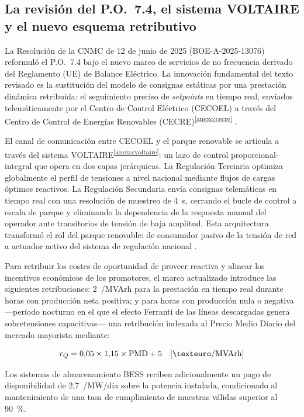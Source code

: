 \subsection{La revisión del P.O.~7.4, el sistema VOLTAIRE y el nuevo
esquema retributivo}
\label{subsec:po74_voltaire}

La Resolución de la CNMC de 12 de junio de 2025 (BOE-A-2025-13076)
reformuló el P.O.~7.4 bajo el nuevo marco de servicios de no frecuencia
derivado del Reglamento (UE) de Balance Eléctrico. La innovación
fundamental del texto revisado es la sustitución del modelo de consignas
estáticas por una prestación dinámica retribuida: el seguimiento preciso
de \textit{setpoints} en tiempo real, enviados telemáticamente por el
Centro de Control Eléctrico (CECOEL) a través del Centro de Control de
Energías Renovables
(CECRE)\textsuperscript{\ref{anexo:cecre}} \cite{boe2025}.

El canal de comunicación entre CECOEL y el parque renovable se articula
a través del sistema VOLTAIRE\textsuperscript{\ref{anexo:voltaire}}: un
lazo de control proporcional-integral que opera en dos capas jerárquicas.
La Regulación Terciaria optimiza globalmente el perfil de tensiones a nivel
nacional mediante flujos de cargas óptimos reactivos. La Regulación
Secundaria envía consignas telemáticas en tiempo real con una resolución
de muestreo de 4~s, cerrando el bucle de control a escala de parque y
eliminando la dependencia de la respuesta manual del operador ante
transitorios de tensión de baja amplitud. Esta arquitectura transformó el
rol del parque renovable: de consumidor pasivo de la tensión de red a
actuador activo del sistema de regulación nacional \cite{boe2025}.

Para retribuir los costes de oportunidad de proveer reactiva y alinear
los incentivos económicos de los promotores, el marco actualizado
introduce las siguientes retribuciones: 2~\texteuro/MVArh para la
prestación en tiempo real durante horas con producción neta positiva; y
para horas con producción nula o negativa ---período nocturno en el que
el efecto Ferranti de las líneas descargadas genera sobretensiones
capacitivas--- una retribución indexada al Precio Medio Diario del
mercado mayorista mediante:

\begin{equation}
    r_Q = 0{,}05 \times 1{,}15 \times \mathrm{PMD} + 5
    \quad [\texteuro/\mathrm{MVArh}]
    \label{eq:retribucion_reactiva_nocturna}
\end{equation}

Los sistemas de almacenamiento BESS reciben adicionalmente un pago de
disponibilidad de 2{,}7~\texteuro/MW/día sobre la potencia instalada,
condicionado al mantenimiento de una tasa de cumplimiento de muestras
válidas superior al 90~\%.

